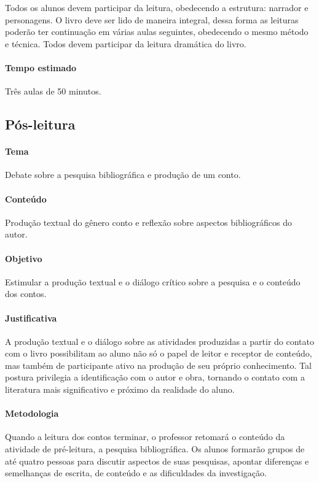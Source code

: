 \documentclass[11pt]{extarticle}
\begin{document}
Todos os alunos devem participar da leitura, obedecendo a estrutura: narrador e personagens. O livro deve ser lido de maneira integral, dessa forma as leituras poderão ter continuação em várias aulas seguintes, obedecendo o mesmo método e técnica. Todos devem participar da leitura dramática do livro.


\paragraph{Tempo estimado} Três aulas de 50 minutos.

\subsection{Pós-leitura}

\paragraph{Tema} Debate sobre a pesquisa bibliográfica e produção de um conto.

\paragraph{Conteúdo} Produção textual do gênero conto e reflexão sobre aspectos bibliográficos do autor.


\paragraph{Objetivo} Estimular a produção textual e o diálogo crítico sobre a pesquisa e o conteúdo dos contos.

\paragraph{Justificativa} A produção textual e o diálogo sobre as atividades produzidas a partir do contato com o livro possibilitam ao aluno não só o papel de leitor e receptor de conteúdo, mas também de participante ativo na produção de seu próprio conhecimento. Tal postura privilegia a identificação com o autor e obra, tornando o contato com a literatura mais significativo e próximo da realidade do aluno.


\paragraph{Metodologia} Quando a leitura dos contos terminar, o professor retomará o conteúdo da atividade de pré-leitura, a pesquisa bibliográfica. Os alunos formarão grupos de até quatro pessoas para discutir aspectos de suas pesquisas, apontar diferenças e semelhanças de escrita, de conteúdo e as dificuldades da investigação.
\end{document}
